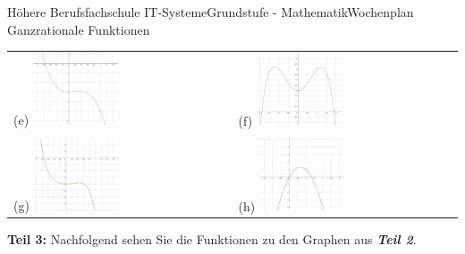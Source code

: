 \documentclass[oneside,openany,headings=optiontotoc,11pt,numbers=noenddot]{scrreprt}
\begin{document}
\begin{worksheet}{Höhere Berufsfachschule IT-Systeme}{Grundstufe - Mathematik}{Wochenplan Ganzrationale Funktionen}
\begin{framed}
\begin{tabularx}{\textwidth}{XX}
				(e) \includegraphics[width=0.4\textwidth,align=t]{../99_Bilder/WP/WP9T2e.png} & (f) \includegraphics[width=0.4\textwidth,align=t]{../99_Bilder/WP/WP9T2f.png}\\
				\\
				(g) \includegraphics[width=0.4\textwidth,align=t]{../99_Bilder/WP/WP9T2g.png} & (h) \includegraphics[width=0.4\textwidth,align=t]{../99_Bilder/WP/WP9T2h.png}\\
			\end{tabularx}
		\end{framed}
		\normalsize
		\begin{framed}
			\noindent
			\textbf{Teil 3:} Nachfolgend sehen Sie die Funktionen zu den Graphen aus \textbf{\textit{Teil 2}}.\\

\end{framed}
\end{worksheet}
\end{document}
